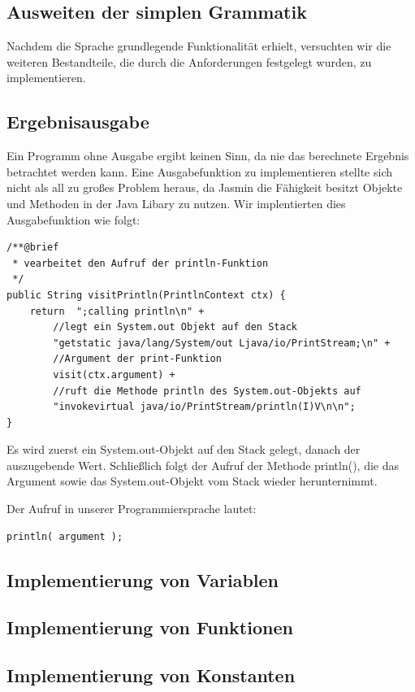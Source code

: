 \documentclass[12pt, a4paper, oneside, ngerman]{article}
\begin{document}
\subsection{Ausweiten der simplen Grammatik}
Nachdem die Sprache grundlegende Funktionalität erhielt, versuchten wir die weiteren Bestandteile, die durch die Anforderungen festgelegt wurden, zu implementieren. 


\subsection*{Ergebnisausgabe}
Ein Programm ohne Ausgabe ergibt keinen Sinn, da nie das berechnete Ergebnis betrachtet werden kann. Eine Ausgabefunktion zu implementieren stellte sich nicht als all zu großes Problem heraus, da Jasmin die Fähigkeit besitzt Objekte und Methoden in der Java Libary zu nutzen. Wir implentierten dies Ausgabefunktion wie folgt:

\begin{lstlisting}[frame=single]
/**@brief
 * vearbeitet den Aufruf der println-Funktion
 */
public String visitPrintln(PrintlnContext ctx) {
	return  ";calling println\n" + 
		//legt ein System.out Objekt auf den Stack
		"getstatic java/lang/System/out Ljava/io/PrintStream;\n" + 	
		//Argument der print-Funktion
		visit(ctx.argument) + 						
		//ruft die Methode println des System.out-Objekts auf
		"invokevirtual java/io/PrintStream/println(I)V\n\n"; 				
}
\end{lstlisting}

Es wird zuerst ein System.out-Objekt auf den Stack gelegt, danach der auszugebende Wert. Schließlich folgt der Aufruf der Methode println(), die das Argument sowie das System.out-Objekt vom Stack wieder herunternimmt.


Der Aufruf in unserer Programmiersprache lautet: 
\begin{lstlisting}[frame=single]
println( argument );
\end{lstlisting}

\subsection{Implementierung von Variablen}

\subsection{Implementierung von Funktionen}


\subsection{Implementierung von Konstanten}
\end{document}
